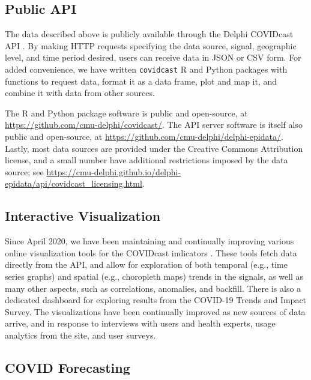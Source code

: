 \documentclass[9pt,twocolumn,twoside,lineno]{pnas-new}
\begin{document}
\subsection{Public API}

The data described above is publicly available through the Delphi COVIDcast API
\cite{CovidcastAPI}.  By making HTTP requests specifying the data source,
signal, geographic level, and time period desired, users can receive data in
JSON or CSV form. For added convenience, we have written \texttt{covidcast} R
\cite{CovidcastR} and Python \cite{CovidcastPy} packages with functions to
request data, format it as a data frame, plot and map it, and combine it with
data from other sources.

The R and Python package software is public and open-source, at
\url{https://github.com/cmu-delphi/covidcast/}.  The API server software is
itself also public and open-source, at
\url{https://github.com/cmu-delphi/delphi-epidata/}.  Lastly, most data sources
are provided under the Creative Commons Attribution license, and a small number
have additional restrictions imposed by the data source; see
\url{https://cmu-delphi.github.io/delphi-epidata/api/covidcast_licensing.html}.

\subsection{Interactive Visualization}

Since April 2020, we have been maintaining and continually improving various
online visualization tools for the COVIDcast indicators \cite{CovidcastViz}.
These tools fetch data directly from the API, and allow for exploration of both
temporal (e.g., time series graphs) and spatial (e.g., choropleth maps) trends
in the signals, as well as many other aspects, such as correlations, anomalies,
and backfill. There is also a dedicated dashboard for exploring results from the
COVID-19 Trends and Impact Survey. The visualizations have been continually
improved as new sources of data arrive, and in response to interviews with users
and health experts, usage analytics from the site, and user surveys.%

\subsection{COVID Forecasting}
\end{document}
